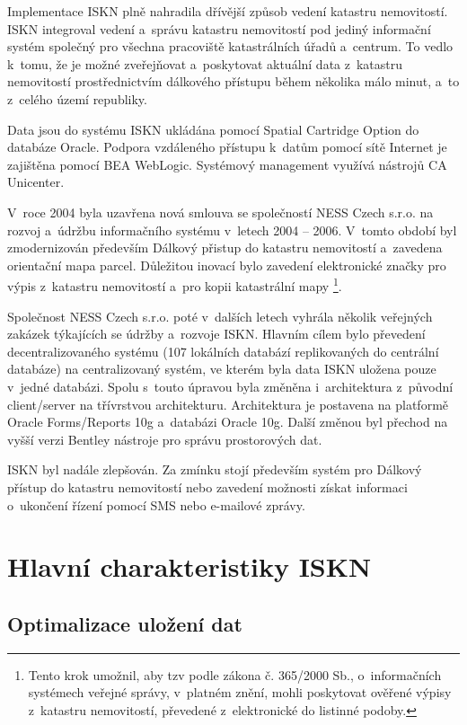 \documentclass[a4paper,12pt,oneside]{book}
\begin{document}
Implementace ISKN plně nahradila dřívější způsob vedení katastru
nemovitostí. ISKN integroval vedení a~správu katastru nemovitostí pod
jediný informační systém společný pro všechna pracoviště katastrálních
úřadů a~centrum. To vedlo k~tomu, že je možné zveřejňovat
a~poskytovat aktuální data z~katastru nemovitostí prostřednictvím
dálkového přístupu během několika málo minut, a~to z~celého území
republiky.

Data jsou do systému ISKN ukládána pomocí Spatial Cartridge Option do
databáze Oracle. Podpora vzdáleného přístupu k~datům pomocí sítě
Internet je zajištěna pomocí BEA WebLogic. Systémový management
využívá nástrojů CA Unicenter.

V~roce 2004 byla uzavřena nová smlouva se společností NESS Czech
s.r.o. na rozvoj a~údržbu informačního systému v~letech 2004 --
2006. V~tomto období byl zmodernizován především Dálkový přistup do
katastru nemovitostí a~zavedena orientační mapa parcel. Důležitou
inovací bylo zavedení elektronické značky pro výpis z~katastru
nemovitostí a~pro kopii katastrální mapy \footnote{Tento krok umožnil,
aby tzv  podle zákona č. 365/2000 Sb., o~informačních
systémech veřejné správy, v~platném znění, mohli poskytovat ověřené
výpisy z~katastru nemovitostí, převedené z~elektronické do listinné
podoby.\cite{iskn}}.

Společnost NESS Czech s.r.o. poté v~dalších letech vyhrála několik
veřejných zakázek týkajících se údržby a~rozvoje ISKN. Hlavním cílem
bylo převedení decentralizovaného systému (107 lokálních databází
replikovaných do centrální databáze) na centralizovaný systém, ve
kterém byla data ISKN uložena pouze v~jedné databázi. Spolu s~touto
úpravou byla změněna i~architektura z~původní client/server na
třívrstvou architekturu. Architektura je postavena na platformě Oracle
Forms/Reports 10g a~databázi Oracle 10g. Další změnou byl přechod na
vyšší verzi Bentley nástroje pro správu prostorových dat.

ISKN byl nadále zlepšován. Za zmínku stojí především systém pro
Dálkový přístup do katastru nemovitostí nebo zavedení možnosti získat
informaci o~ukončení řízení pomocí SMS nebo e-mailové
zprávy.


\section{Hlavní charakteristiky ISKN}

\subsection{Optimalizace uložení dat}
\end{document}
